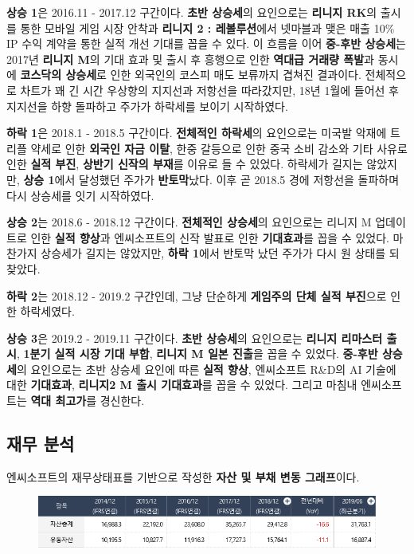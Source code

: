 \documentclass[11pt]{oblivoir}
\begin{document}
		\textbf{상승 1}은 2016.11 - 2017.12 구간이다. \textbf{초반 상승세}의 요인으로는 \textbf{리니지 RK}의 출시를 통한 모바일 게임 시장 안착과 \textbf{리니지 2 : 레볼루션}에서 넷마블과 맺은 매출 10\% IP 수익 계약을 통한 실적 개선 기대를 꼽을 수 있다. 이 흐름을 이어 \textbf{중-후반 상승세}는 2017년 \textbf{리니지 M}의 기대 효과 및 출시 후 흥행으로 인한 \textbf{역대급 거래량 폭발}과 동시에 \textbf{코스닥의 상승세}로 인한 외국인의 코스피 매도 보류까지 겹쳐진 결과이다. 전체적으로 차트가 꽤 긴 시간 우상향의 지지선과 저항선을 따라갔지만, 18년 1월에 들어선 후 지지선을 하향 돌파하고 주가가 하락세를 보이기 시작하였다. 
		
		\textbf{하락 1}은 2018.1 - 2018.5 구간이다. \textbf{전체적인 하락세}의 요인으로는 미국발 악재에 트리플 약세로 인한 \textbf{외국인 자금 이탈}, 한중 갈등으로 인한 중국 소비 감소와 기타 사유로 인한 \textbf{실적 부진}, \textbf{상반기 신작의 부재}를 이유로 들 수 있었다. 하락세가 길지는 않았지만, \textbf{상승 1}에서 달성했던 주가가 \textbf{반토막}났다. 이후 곧 2018.5 경에 저항선을 돌파하며 다시 상승세를 잇기 시작하였다.
		
		\textbf{상승 2}는 2018.6 - 2018.12 구간이다. \textbf{전체적인 상승세}의 요인으로는 리니지 M 업데이트로 인한 \textbf{실적 향상}과 엔씨소프트의 신작 발표로 인한 \textbf{기대효과}를 꼽을 수 있었다. 마찬가지 상승세가 길지는 않았지만, \textbf{하락 1}에서 반토막 났던 주가가 다시 원 상태를 되찾았다.
		
		\textbf{하락 2}는 2018.12 - 2019.2 구간인데, 그냥 단순하게 \textbf{게임주의 단체 실적 부진}으로 인한 하락세였다.
		
		\textbf{상승 3}은 2019.2 - 2019.11 구간이다. \textbf{초반 상승세}의 요인으로는 \textbf{리니지 리마스터 출시}, \textbf{1분기 실적 시장 기대 부합}, \textbf{리니지 M 일본 진출}을 꼽을 수 있었다. \textbf{중-후반 상승세}의 요인으로는 초반 상승세 요인에 따른 \textbf{실적 향상}, 엔씨소프트 R\&D의 AI 기술에 대한 \textbf{기대효과}, \textbf{리니지2 M 출시 기대효과}를 꼽을 수 있었다. 그리고 마침내 엔씨소프트는 \textbf{역대 최고가}를 경신한다.
		
		\subsection{재무 분석}
		엔씨소프트의 재무상태표를 기반으로 작성한 \textbf{자산 및 부채 변동 그래프}이다.
		
		\begin{figure}[htbp]
			\centering
			\includegraphics[width=1\textwidth]{Pictures/zaemustate2.png}
		\end{figure}
		
\end{document}
